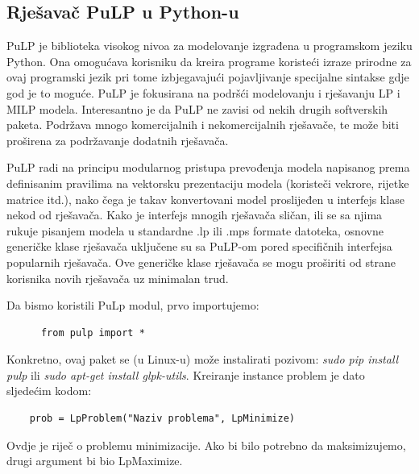 \documentclass[a4paper, utf8, 11pt, colorlinks]{article}
\begin{document}
 \subsection{Rješavač PuLP u Python-u}
 PuLP je biblioteka visokog nivoa za modelovanje izgrađena u programskom jeziku Python.  
 Ona omogućava korisniku da kreira programe koristeći izraze prirodne za ovaj programski jezik 
 pri tome izbjegavajući pojavljivanje specijalne sintakse gdje god je to moguće. PuLP je fokusirana na podršći modelovanju i rješavanju LP i MILP modela. Interesantno je da PuLP 
 ne zavisi od nekih drugih softverskih paketa.   Podržava mnogo komercijalnih i nekomercijalnih rješavače, te može biti proširena za podržavanje dodatnih rješavača. 
 
 PuLP radi na principu modularnog pristupa prevođenja modela napisanog prema definisanim pravilima na vektorsku prezentaciju modela (koristeči vekrore, rijetke matrice itd.), nako čega je takav konvertovani model proslijeđen u interfejs klase nekod od rješavača. Kako je interfejs mnogih rješavača sličan, ili se sa njima rukuje pisanjem modela u standardne .lp ili .mps  formate datoteka, osnovne generičke klase rješavača uključene su sa PuLP-om pored specifičnih interfejsa popularnih rješavača. Ove generičke klase rješavača se mogu proširiti od strane korisnika novih rješavača uz minimalan trud.   
 
 Da bismo koristili PuLp modul, prvo importujemo:
 \begin{verbatim}
 	  from pulp import *
 \end{verbatim}
 Konkretno, ovaj paket se (u Linux-u) može instalirati pozivom: \emph{sudo pip install pulp} ili \emph{sudo apt-get install glpk-utils}. 
 Kreiranje instance problem je dato sljedećim kodom:
 \begin{verbatim}
 	prob = LpProblem("Naziv problema", LpMinimize)
 \end{verbatim}
Ovdje je   riječ o problemu minimizacije. Ako bi bilo potrebno da maksimizujemo, drugi argument bi bio 
LpMaximize. 
\end{document}
